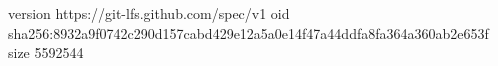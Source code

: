 version https://git-lfs.github.com/spec/v1
oid sha256:8932a9f0742c290d157cabd429e12a5a0e14f47a44ddfa8fa364a360ab2e653f
size 5592544

